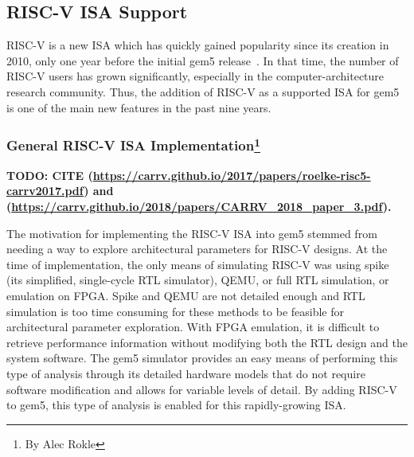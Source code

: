 \subsection[RISC-V ISA Support]{RISC-V ISA Support}

RISC-V is a new ISA which has quickly gained popularity since its creation in 2010, only one year before the initial gem5 release~\cite{Waterman2011riscv}.
In that time, the number of RISC-V users has grown significantly, especially in the computer-architecture research community.
Thus, the addition of RISC-V as a supported ISA for gem5 is one of the main new features in the past nine years.

\subsubsection[General RISC-V ISA Implementation]{General RISC-V ISA Implementation\footnote{By Alec Rokle}}

\textbf{TODO: CITE (\url{https://carrv.github.io/2017/papers/roelke-risc5-carrv2017.pdf}) and (\url{https://carrv.github.io/2018/papers/CARRV_2018_paper_3.pdf}).}

The motivation for implementing the RISC-V ISA into gem5 stemmed from needing a way to explore architectural parameters for RISC-V designs.
At the time of implementation, the only means of simulating RISC-V was using spike (its simplified, single-cycle RTL simulator), QEMU, or full RTL simulation, or emulation on FPGA.
Spike and QEMU are not detailed enough and RTL simulation is too time consuming for these methods to be feasible for architectural parameter exploration. With FPGA emulation, it is difficult to retrieve performance information without modifying both the RTL design and the system software.
The gem5 simulator provides an easy means of performing this type of analysis through its detailed hardware models that do not require software modification and allows for variable levels of detail.
By adding RISC-V to gem5, this type of analysis is enabled for this rapidly-growing ISA.

